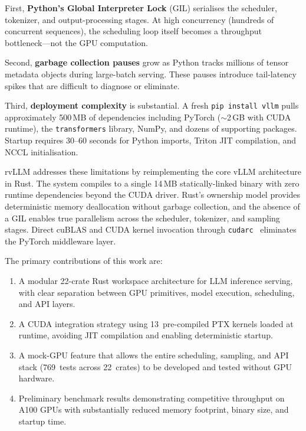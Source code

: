 \documentclass[11pt,a4paper]{article}
\begin{document}
First, \textbf{Python's Global Interpreter Lock} (GIL) serialises the scheduler,
tokenizer, and output-processing stages. At high concurrency (hundreds of concurrent
sequences), the scheduling loop itself becomes a throughput bottleneck---not the GPU
computation.

Second, \textbf{garbage collection pauses} grow as Python tracks millions of tensor
metadata objects during large-batch serving. These pauses introduce tail-latency
spikes that are difficult to diagnose or eliminate.

Third, \textbf{deployment complexity} is substantial. A fresh \texttt{pip install vllm}
pulls approximately 500\,MB of dependencies including PyTorch ($\sim$2\,GB with CUDA
runtime), the \texttt{transformers} library, NumPy, and dozens of supporting packages.
Startup requires 30--60 seconds for Python imports, Triton JIT compilation, and NCCL
initialisation.

rvLLM addresses these limitations by reimplementing the core vLLM architecture in Rust.
The system compiles to a single 14\,MB statically-linked binary with zero runtime
dependencies beyond the CUDA driver. Rust's ownership model provides deterministic
memory deallocation without garbage collection, and the absence of a GIL enables true
parallelism across the scheduler, tokenizer, and sampling stages. Direct cuBLAS and
CUDA kernel invocation through \texttt{cudarc}~\cite{cudarc2023} eliminates the
PyTorch middleware layer.

The primary contributions of this work are:
\begin{enumerate}
  \item A modular 22-crate Rust workspace architecture for LLM inference serving,
        with clear separation between GPU primitives, model execution, scheduling,
        and API layers.
  \item A CUDA integration strategy using 13~pre-compiled PTX kernels loaded at
        runtime, avoiding JIT compilation and enabling deterministic startup.
  \item A mock-GPU feature that allows the entire scheduling, sampling, and API
        stack (769~tests across 22~crates) to be developed and tested without GPU
        hardware.
  \item Preliminary benchmark results demonstrating competitive throughput on A100
        GPUs with substantially reduced memory footprint, binary size, and startup
        time.
\end{enumerate}
\end{document}
